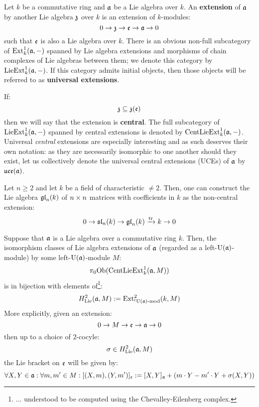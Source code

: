         \begin{definition}
            Let $k$ be a commutative ring and $\mathfrak{a}$ be a Lie algebra over $k$. An \textbf{extension} of $\mathfrak{a}$ by another Lie algebra $\mathfrak{z}$ over $k$ is an extension of $k$-modules:
                $$0 \to \mathfrak{z} \to \mathfrak{e} \to \mathfrak{a} \to 0$$
            such that $\mathfrak{e}$ is also a Lie algebra over $k$. There is an obvious non-full subcategory of $\mathrm{Ext}^1_k(\mathfrak{a}, -)$ spanned by Lie algebra extensions and morphisms of chain complexes of Lie algebras between them; we denote this category by $\mathrm{Lie}\mathrm{Ext}^1_k(\mathfrak{a}, -)$. If this category admits initial objects, then those objects will be referred to as \textbf{universal extensions}.
            
            If:
                $$\mathfrak{z} \subseteq \mathfrak{z}(\mathfrak{e})$$
            then we will say that the extension is \textbf{central}. The full subcategory of $\mathrm{Lie}\mathrm{Ext}^1_k(\mathfrak{a}, -)$ spanned by central extensions is denoted by $\mathrm{Cent}\mathrm{Lie}\mathrm{Ext}^1_k(\mathfrak{a}, -)$. Universal \textit{central} extensions are especially interesting and as such deserves their own notation: as they are necessarily isomorphic to one another should they exist, let us collectively denote the universal central extensions (UCEs) of $\mathfrak{a}$ by $\mathfrak{uce}(\mathfrak{a})$.
        \end{definition}
        \begin{example}
            Let $n \geq 2$ and let $k$ be a field of characteristic $\not = 2$. Then, one can construct the Lie algebra $\mathfrak{gl}_n(k)$ of $n \x n$ matrices with coefficients in $k$ as the non-central extension:
                $$0 \to \mathfrak{sl}_n(k) \to \mathfrak{gl}_n(k) \xrightarrow[]{\operatorname{tr}} k \to 0$$
        \end{example}
        \begin{proposition}[$H^2_{\Lie}$ = extensions]
            \cite[Theorem VIII.3.3]{hilton_stammbach_homological_algebra} Suppose that $\mathfrak{a}$ is a Lie algebra over a commutative ring $k$. Then, the isomorphism classes of Lie algebra extensions of $\mathfrak{a}$ (regarded as a left-$\mathrm{U}(\mathfrak{a})$-module) by some left-$\mathrm{U}(\mathfrak{a})$-module $M$:
                $$\pi_0\mathrm{Ob}( \mathrm{Cent}\mathrm{Lie}\mathrm{Ext}^1_k(\mathfrak{a}, M) )$$
            is in bijection with elements of\footnote{... understood to be computed using the Chevalley-Eilenberg complex.}:
                $$H^2_{\mathrm{Lie}}(\mathfrak{a}, M) := \mathrm{Ext}^2_{{}^l\mathrm{U}(\mathfrak{a})\text{-}\mathrm{mod}}(k, M)$$
            More explicitly, given an extension:
                $$0 \to M \to \mathfrak{e} \to \mathfrak{a} \to 0$$
            then up to a choice of $2$-cocyle:
                $$\sigma \in H^2_{\mathrm{Lie}}(\mathfrak{a}, M)$$
            the Lie bracket on $\mathfrak{e}$ will be given by:
                $$\forall X, Y \in \mathfrak{a}: \forall m, m' \in M: [ (X, m), (Y, m') ]_{\mathfrak{e}} := [X, Y]_{\mathfrak{a}} + ( m \cdot Y - m' \cdot Y + \sigma(X, Y) )$$
        \end{proposition}

